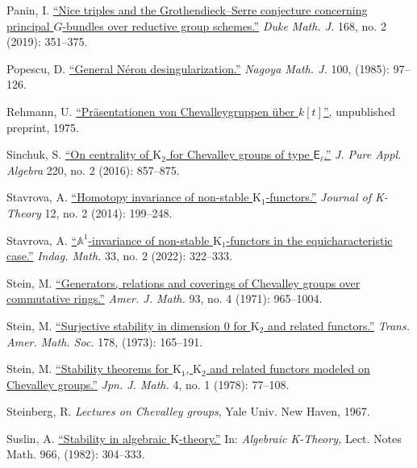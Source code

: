 \documentclass[oneside, 11pt]{amsart}
\numberwithin{equation}{section}
\newcommand{\K}{{\mathrm{K}}}
\theoremstyle{definition}
\theoremstyle{definition}
\theoremstyle{remark}
\begin{document}
\begin{thebibliography}{0}
Panin, I.
\href{http://dx.doi.org/10.1215/00127094-2018-0042}{``Nice triples and the Grothendieck–Serre conjecture concerning principal $G$-bundles over reductive group schemes.''}
\textit{Duke Math. J.} 168, no. 2 (2019): 351--375.

Popescu, D.
\href{http://dx.doi.org/10.1017/S0027763000000246}{``General N{\'e}ron desingularization.''}
\textit{Nagoya Math. J.} 100, (1985): {97--126}.


Rehmann, U.
\href{http://www.math.uni-bielefeld.de/~rehmann/Publ/praesentation.pdf}{``Pr{\"a}sentationen von Chevalleygruppen {\"u}ber $k[t]$'',} unpublished preprint, 1975.

Sinchuk, S.
\href{http://dx.doi.org/10.1016/j.jpaa.2015.08.003}{``On centrality of $\K_2$ for {C}hevalley groups of type $\mathsf{E}_\ell$.''}
\textit{J. Pure Appl. Algebra} 220, no. 2 (2016): 857--875.

Stavrova, A.
\href{http://dx.doi.org/10.1017/is013006012jkt232}{``Homotopy invariance of non-stable $\K_1$-functors.''}
\textit{Journal of K-Theory} 12, no. 2 (2014): 199--248.
  
Stavrova, A.
\href{http://dx.doi.org/10.1016/j.indag.2021.08.002}{``$\mathbb A^1$-invariance of non-stable $\K_1$-functors in the equicharacteristic case.''}
\textit{Indag. Math.} 33, no. 2 (2022): {322--333}.

Stein, M.
\href{http://dx.doi.org/10.2307/2373742}{``Generators, relations and coverings of Chevalley groups over commutative rings.''}
\textit{Amer. J. Math.} 93, no. 4 (1971): {965--1004}.

Stein, M.
\href{https://www.ams.org/journals/tran/1973-178-00/S0002-9947-1973-0327925-8/S0002-9947-1973-0327925-8.pdf}
{``Surjective stability in dimension 0 for $\K_2$ and related functors.''}
\textit{Trans. Amer. Math. Soc.} 178, (1973): {165--191}.

Stein, M.
\href{http://dx.doi.org/10.4099/math1924.4.77}{``Stability theorems for $\K_1$, $\K_2$ and related functors modeled on Chevalley groups.''}
\textit{Jpn. J. Math.} 4, no. 1 (1978): 77--108.  

Steinberg, R. \textit{Lectures on Chevalley groups}, Yale Univ. New Haven, 1967.

Suslin, A.
\href{http://dx.doi.org/10.1007/BFb0062181}{``Stability in algebraic $\K$-theory.''}
In: \textit{Algebraic K-Theory,} Lect. Notes Math. 966, (1982): {304--333}.


\end{thebibliography}
\end{document}

